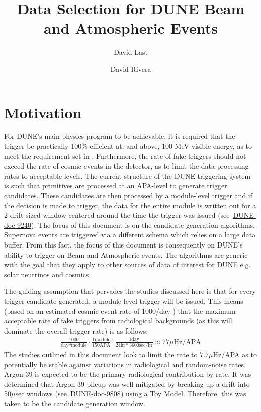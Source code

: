 \documentclass[10pt]{article}
\title{\vspace*{\fill} \textbf{Data Selection for DUNE Beam and Atmospheric Events}}
\author[1]{David Last}
\author[1]{David Rivera}
\affil{University of Pennsylvania}
\begin{document}
\maketitle
\mbox{}
\vspace*{4in}
\newpage


\maketitle

\section{Motivation}
For DUNE's main physics program to be achievable, it is required that the trigger be practically 100\% efficient at, and above, 100 MeV visible energy, as to meet the requirement set in %
. Furthermore, the rate of fake triggers should not exceed the rate of cosmic events in the detector, as to limit the data processing rates to acceptable levels. The current structure of the DUNE triggering system is such that primitives are processed at an APA-level to generate trigger candidates. These candidates are then processed by a module-level trigger and if the decision is made to trigger, the data for the entire module is written out for a 2-drift sized window centered around the time the trigger was issued (see~\href{https://docs.dunescience.org/cgi-bin/private/ShowDocument?docid=9240}{DUNE-doc-9240}).
The focus of this document is on the candidate generation algorithms. Supernova events are triggered via a different schema which relies on a large data buffer. From this fact, the focus of this document is consequently on DUNE's ability to trigger on Beam and Atmospheric events. The algorithms are generic with the goal that they apply to other sources of data of interest for DUNE e.g. solar neutrinos and cosmics.

The guiding assumption that pervades the studies discussed here is that for every trigger candidate generated, a module-level trigger will be issued. This means (based on an estimated cosmic event rate of 1000/day
) that the maximum acceptable rate of fake triggers from radiological backgrounds (as this will dominate the overall trigger rate) is as follows:
\begin{align*}
    \frac{1000}{\text{day}*\text{module}}\cdot\frac{1\text{module}}{150\text{APA}}\cdot\frac{1\text{day}}{24 \text{hr}*3600\text{sec}/\text{hr}}\approx 77\mu \text{Hz}/\text{APA}
\end{align*}
The studies outlined in this document look to limit the rate to $7.7\mu$Hz/APA as to potentially be stable against variations in radiological and random-noise rates. Argon-39 is expected to be the primary radiological contribution by rate. It was determined that Argon-39 pileup was well-mitigated by breaking up a drift into 50$\mu$sec windows (see~\href{https://docs.dunescience.org/cgi-bin/private/ShowDocument?docid=9808}{DUNE-doc-9808}) using a Toy Model. Therefore, this was taken to be the candidate generation window.
\end{document}
